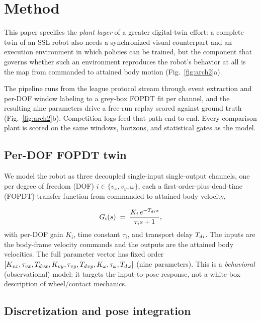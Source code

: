 \section{Method}
\label{sec:method}



This paper specifies the \emph{plant layer} of a greater digital-twin effort: a complete twin of an SSL robot also needs a synchronized visual counterpart and an execution environment in which policies can be trained, but the component that governs whether such an environment reproduces the robot's behavior at all is the map from commanded to attained body motion (Fig.~\ref{fig:arch2}a).

The pipeline runs from the league protocol stream through event extraction and per-DOF window labeling to a grey-box FOPDT fit per channel, and the resulting nine parameters drive a free-run replay scored against ground truth (Fig.~\ref{fig:arch2}b). Competition logs feed that path end to end. Every comparison plant is scored on the same windows, horizons, and statistical gates as the model.

\subsection{Per-DOF FOPDT twin}
\label{sec:method:model}
We model the robot as three decoupled single-input single-output channels, one per degree of freedom (DOF) $i\in\{v_x, v_y, \omega\}$, each a first-order-plus-dead-time (FOPDT) transfer function from commanded to attained body velocity,

\begin{equation}
  G_i(s) \;=\; \frac{K_i\, e^{-T_{d}{}_i s}}{\tau_i s + 1},
  \label{eq:fopdt}
\end{equation}
with per-DOF gain $K_i$, time constant $\tau_i$, and transport delay $T_{d}{}_i$. The inputs are the body-frame velocity commands and the outputs are the attained body velocities. The full parameter vector has fixed order $[K_{vx},\tau_{vx},T_{d}{}_{vx},K_{vy},\tau_{vy},T_{d}{}_{vy},K_{\omega},\tau_{\omega},T_{d}{}_{\omega}]$
(nine parameters). %
This is a \emph{behavioral} (observational) model: it targets the input-to-pose
response, not a white-box description of wheel/contact mechanics.

\subsection{Discretization and pose integration}
\label{sec:method:disc}

